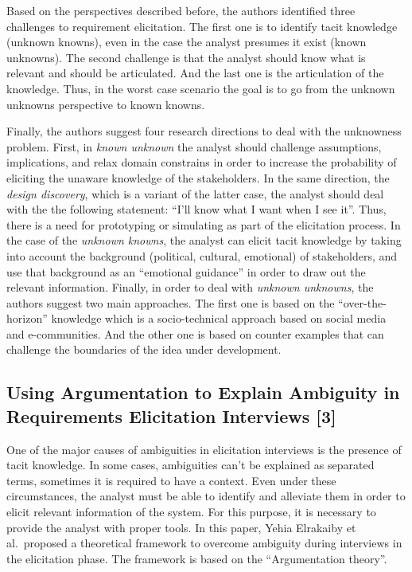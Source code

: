 \documentclass[]{llncs}
\begin{document}
Based on the perspectives described before, the authors identified three
challenges to requirement elicitation. The first one is to identify
tacit knowledge (unknown knowns), even in the case the analyst presumes
it exist (known unknowns). The second challenge is that the analyst
should know what is relevant and should be articulated. And the last one
is the articulation of the knowledge. Thus, in the worst case scenario
the goal is to go from the unknown unknowns perspective to known knowns.

Finally, the authors suggest four research directions to deal with the
unknowness problem. First, in \emph{known unknown} the analyst should
challenge assumptions, implications, and relax domain constrains in
order to increase the probability of eliciting the unaware knowledge of
the stakeholders. In the same direction, the \emph{design discovery},
which is a variant of the latter case, the analyst should deal with the
the following statement: ``I'll know what I want when I see it''. Thus,
there is a need for prototyping or simulating as part of the elicitation
process. In the case of the \emph{unknown knowns}, the analyst can
elicit tacit knowledge by taking into account the background (political,
cultural, emotional) of stakeholders, and use that background as an
``emotional guidance'' in order to draw out the relevant information.
Finally, in order to deal with \emph{unknown unknowns}, the authors
suggest two main approaches. The first one is based on the
``over-the-horizon'' knowledge which is a socio-technical approach based
on social media and e-communities. And the other one is based on counter
examples that can challenge the boundaries of the idea under
development.

\hypertarget{using-argumentation-to-explain-ambiguity-in-requirements-elicitation-interviews-elrakaiby2017using}{%
\subsection{Using Argumentation to Explain Ambiguity in Requirements
Elicitation Interviews
{[}3{]}}\label{using-argumentation-to-explain-ambiguity-in-requirements-elicitation-interviews-elrakaiby2017using}}

One of the major causes of ambiguities in elicitation interviews is the
presence of tacit knowledge. In some cases, ambiguities can't be
explained as separated terms, sometimes it is required to have a
context. Even under these circumstances, the analyst must be able to
identify and alleviate them in order to elicit relevant information of
the system. For this purpose, it is necessary to provide the analyst
with proper tools. In this paper, Yehia Elrakaiby et al.~proposed a
theoretical framework to overcome ambiguity during interviews in the
elicitation phase. The framework is based on the ``Argumentation
theory''.
\end{document}
